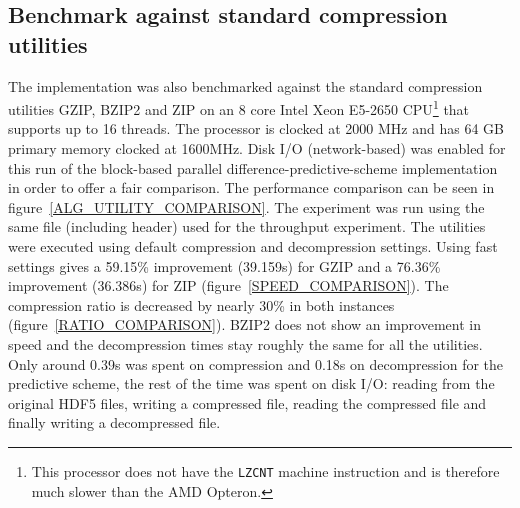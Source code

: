\subsection{Benchmark against standard compression utilities}
The implementation was also benchmarked against the standard compression utilities GZIP, BZIP2 and ZIP on an 8 core Intel Xeon E5-2650 CPU\footnote{This processor does not have 
the \texttt{LZCNT} machine instruction and is therefore much slower than the AMD Opteron.} that supports up to 16 threads. The processor is clocked at 2000 MHz and has 64 GB
primary memory clocked at 1600MHz. Disk I/O (network-based) was enabled for this run of the block-based parallel difference-predictive-scheme implementation in order to offer
a fair comparison. The performance comparison can be seen in figure~\ref{ALG_UTILITY_COMPARISON}. The experiment was run using the same file (including header) used for the throughput experiment. 
The utilities were executed using default compression and decompression settings. Using fast settings gives a 59.15\% improvement (39.159s) for GZIP and a 76.36\% improvement (36.386s) for ZIP (figure~\ref{SPEED_COMPARISON}). 
The compression ratio is decreased by nearly 30\% in both instances (figure~\ref{RATIO_COMPARISON}). BZIP2 does not show an improvement in speed and the decompression times stay roughly the same for all the utilities.  
Only around 0.39s was spent on compression and 0.18s on decompression for the predictive scheme, the rest of the time was spent on disk I/O: reading from the original HDF5 files, writing a compressed file, 
reading the compressed file and finally writing a decompressed file.

